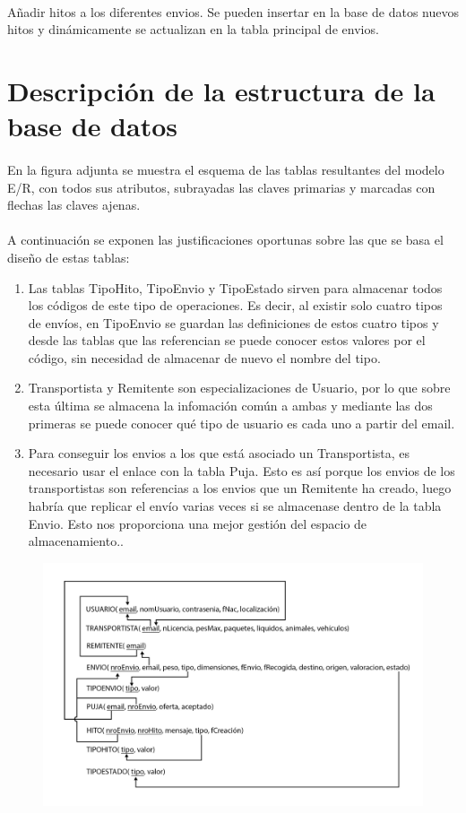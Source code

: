 \documentclass[10pt, a4paper,spanish]{article}
\begin{document}
		\paragraph{}
		Añadir hitos a los diferentes envios. Se pueden insertar en la base de datos nuevos hitos y dinámicamente se actualizan en la tabla principal de envios.
    \section{Descripción de la estructura de la base de datos}

    		\paragraph{}
		En la figura adjunta se muestra el esquema de las tablas resultantes del modelo E/R, con todos sus atributos, subrayadas las claves primarias y marcadas con flechas las claves ajenas.

		\paragraph{}
		A continuación se exponen las justificaciones oportunas sobre las que se basa el diseño de estas tablas:
		\begin{enumerate}
			\item Las tablas TipoHito, TipoEnvio y TipoEstado sirven para almacenar todos los códigos de este tipo de operaciones. Es decir, al existir solo cuatro tipos de envíos, en TipoEnvio se guardan las definiciones de estos cuatro tipos y desde las tablas que las referencian se puede conocer estos valores por el código, sin necesidad de almacenar de nuevo el nombre del tipo.
			\item Transportista y Remitente son especializaciones de Usuario, por lo que sobre esta última se almacena la infomación común a ambas y mediante las dos primeras se puede conocer qué tipo de usuario es cada uno a partir del email.
			\item Para conseguir los envios a los que está asociado un Transportista, es necesario usar el enlace con la tabla Puja. Esto es así porque los envios de los transportistas son referencias a los envios que un Remitente ha creado, luego habría que replicar el envío varias veces si se almacenase dentro de la tabla Envio. Esto nos proporciona una mejor gestión del espacio de almacenamiento..
		\end{enumerate}

		\begin{figure}[H]
			\centering
				\includegraphics[width=1\textwidth]{database.png}
		\end{figure}
\end{document}
